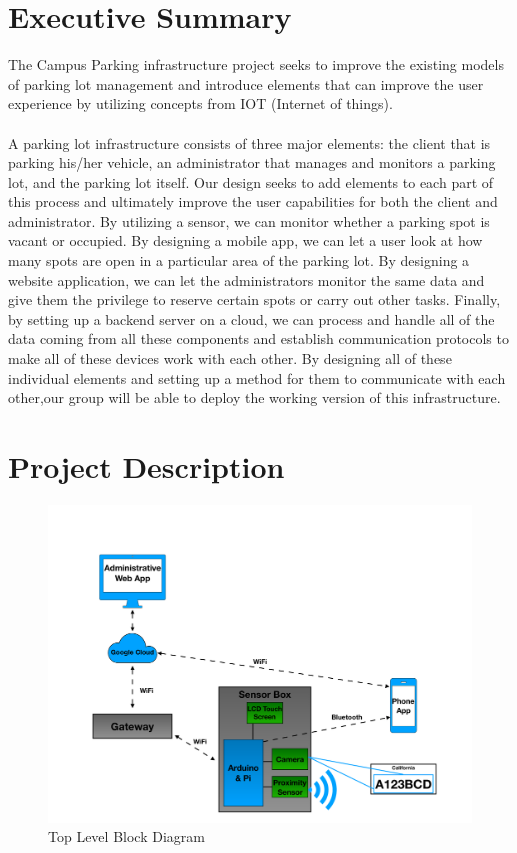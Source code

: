 \documentclass[paper=a4, fontsize=12pt]{scrartcl}
\numberwithin{equation}{section}		%
\numberwithin{figure}{section}			%
\numberwithin{table}{section}				%
\begin{document}
\section{Executive Summary}
The Campus Parking infrastructure project seeks to improve the existing models of parking lot management and introduce elements that can improve the user experience by utilizing concepts from IOT (Internet of things).
\\\\
A parking lot infrastructure consists of three major elements: the client that is parking his/her vehicle, an administrator that manages and monitors a parking lot, and the parking lot itself. Our design seeks to add elements to each part of this process and ultimately improve the user capabilities for both the client and administrator. By utilizing a sensor, we can monitor whether a parking spot is vacant or occupied. By designing a mobile app, we can let a user look at how many spots are open in a particular area of the parking lot. By designing a website application, we can let the administrators monitor the same data and give them the privilege to reserve certain spots or carry out other tasks. Finally, by setting up a backend server on a cloud, we can process and handle all of the data coming from all these components and establish communication protocols to make all of these devices work with each other. By designing all of these individual elements and setting up a method for them to communicate with each other,our group will be able to deploy the working version of this infrastructure.

\section{Project Description}
\begin{figure}[H]
\centering
\includegraphics[width=15cm]{NoTitle_BlockDiagram_CE123_tfine.pdf}
\caption{Top Level Block Diagram}
\label{adminReserve}
\end{figure}
\end{document}

